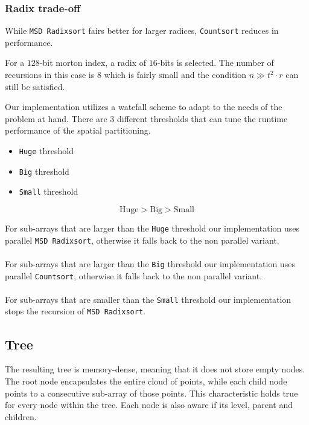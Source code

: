 \documentclass{juliacon}
\begin{document}
\subsubsection{Radix trade-off}
While \verb|MSD Radixsort| fairs better for larger radices, \verb|Countsort| reduces in
performance.

\begin{example}
  For a $128$-bit morton index, a radix of $16$-bits is selected.
  The number of recursions in this case is $8$ which is fairly small and the condition
  $n\gg t^2\cdot r$ can still be satisfied.
\end{example}

Our implementation utilizes a watefall scheme to adapt to the needs of the problem at
hand. There are $3$ different thresholds that can tune the runtime performance of the
spatial partitioning.

\begin{itemize}
  \item \verb|Huge| threshold
  \item \verb|Big| threshold
  \item \verb|Small| threshold
\end{itemize}

$$ \textrm{Huge} > \textrm{Big} > \textrm{Small} $$

For sub-arrays that are larger than the \verb|Huge| threshold our implementation
uses parallel \verb|MSD Radixsort|, otherwise it falls back to the non parallel variant.
\\\\
For sub-arrays that are larger than the \verb|Big| threshold our implementation uses
parallel \verb|Countsort|, otherwise it falls back to the non parallel variant.
\\\\
For sub-arrays that are smaller than the \verb|Small| threshold our implementation
stops the recursion of \verb|MSD Radixsort|.


\subsection{Tree}
The resulting tree is memory-dense, meaning that it does not store empty nodes.
The root node encapsulates the entire cloud of points, while each child node points to
a consecutive sub-array of those points. This characteristic holds true for every node
within the tree. Each node is also aware if its level, parent and children.
\end{document}
